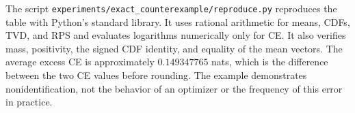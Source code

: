 The script \texttt{experiments/exact\_counterexample/reproduce.py} reproduces the table with Python's standard library.
It uses rational arithmetic for means, CDFs, TVD, and RPS and evaluates logarithms numerically only for CE.
It also verifies mass, positivity, the signed CDF identity, and equality of the mean vectors.
The average excess CE is approximately $0.149347765$ nats, which is the difference between the two CE values before rounding.
The example demonstrates nonidentification, not the behavior of an optimizer or the frequency of this error in practice.

